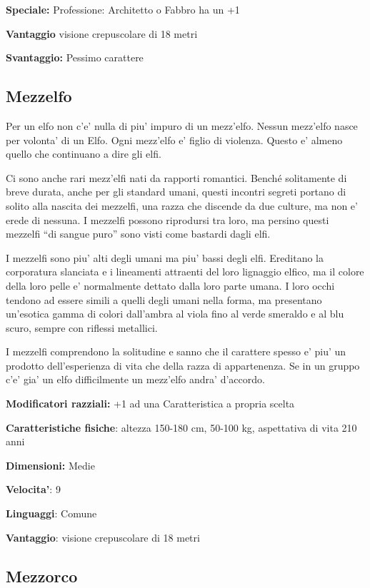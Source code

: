 \documentclass[a4paper,11pt,twoside,openany]{dndbook}
\begin{document}
\textbf{Speciale:} Professione: Architetto o Fabbro ha un +1

\textbf{Vantaggio} visione crepuscolare di 18 metri

\textbf{Svantaggio:} Pessimo carattere

\subsection{Mezzelfo}

\label{mezzelfo}

Per un elfo non c'e' nulla di piu' impuro di un mezz'elfo. Nessun mezz'elfo nasce per volonta' di un Elfo. Ogni mezz'elfo e' figlio di violenza. Questo e' almeno quello che continuano a dire gli elfi.

Ci sono anche rari mezz'elfi nati da rapporti romantici. Benché solitamente di breve durata, anche per gli standard umani, questi incontri segreti portano di solito alla nascita dei mezzelfi, una razza che discende da due culture, ma non e' erede di nessuna. I mezzelfi possono riprodursi tra loro, ma persino questi mezzelfi ``di sangue puro'' sono visti come bastardi dagli elfi.

I mezzelfi sono piu' alti degli umani ma piu' bassi degli elfi. Ereditano la corporatura slanciata e i lineamenti attraenti del loro lignaggio elfico, ma il colore della loro pelle e' normalmente dettato dalla loro parte umana. I loro occhi tendono ad essere simili a quelli degli umani nella forma, ma presentano un'esotica gamma di colori dall'ambra al viola fino al verde smeraldo e al blu scuro, sempre con riflessi metallici.

I mezzelfi comprendono la solitudine e sanno che il carattere spesso e' piu' un prodotto dell'esperienza di vita che della razza di appartenenza. Se in un gruppo c'e' gia' un elfo difficilmente un mezz'elfo andra' d'accordo.

\textbf{Modificatori razziali:} +1 ad una Caratteristica a propria
scelta

\textbf{Caratteristiche fisiche}: altezza 150-180 cm, 50-100 kg, aspettativa
di vita 210 anni

\textbf{Dimensioni:} Medie

\textbf{Velocita'}: 9

\textbf{Linguaggi}: Comune

\textbf{Vantaggio}: visione crepuscolare di 18 metri


\subsection{Mezzorco}
\end{document}
